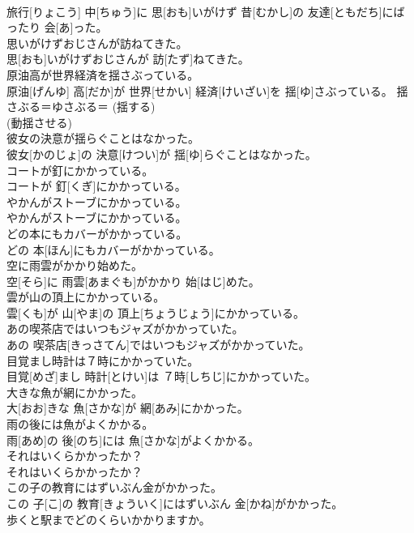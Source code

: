 \documentclass[8pt]{extreport}
\begin{document}
\begin{CJK}{UTF8}{min}
{\\	旅行[りょこう] 中[ちゅう]に 思[おも]いがけず 昔[むかし]の 友達[ともだち]にばったり 会[あ]った。	
\\	思いがけずおじさんが訪ねてきた。	
\\	思[おも]いがけずおじさんが 訪[たず]ねてきた。	
\\	原油高が世界経済を揺さぶっている。	
\\	原油[げんゆ] 高[だか]が 世界[せかい] 経済[けいざい]を 揺[ゆ]さぶっている。	揺さぶる＝ゆさぶる＝ (揺する) 
\\	(動揺させる) 
\\	彼女の決意が揺らぐことはなかった。	
\\	彼女[かのじょ]の 決意[けつい]が 揺[ゆ]らぐことはなかった。	
\\	コートが釘にかかっている。	
\\	コートが 釘[くぎ]にかかっている。	
\\	やかんがストーブにかかっている。	
\\	やかんがストーブにかかっている。	
\\	どの本にもカバーがかかっている。	
\\	どの 本[ほん]にもカバーがかかっている。	
\\	空に雨雲がかかり始めた。	
\\	空[そら]に 雨雲[あまぐも]がかかり 始[はじ]めた。	
\\	雲が山の頂上にかかっている。	
\\	雲[くも]が 山[やま]の 頂上[ちょうじょう]にかかっている。	
\\	あの喫茶店ではいつもジャズがかかっていた。	
\\	あの 喫茶店[きっさてん]ではいつもジャズがかかっていた。	
\\	目覚まし時計は７時にかかっていた。	
\\	目覚[めざ]まし 時計[とけい]は ７時[しちじ]にかかっていた。	
\\	大きな魚が網にかかった。	
\\	大[おお]きな 魚[さかな]が 網[あみ]にかかった。	
\\	雨の後には魚がよくかかる。	
\\	雨[あめ]の 後[のち]には 魚[さかな]がよくかかる。	
\\	それはいくらかかったか？	
\\	それはいくらかかったか？	
\\	この子の教育にはずいぶん金がかかった。	
\\	この 子[こ]の 教育[きょういく]にはずいぶん 金[かね]がかかった。	
\\	歩くと駅までどのくらいかかりますか。	
}
\end{CJK}
\end{document}
